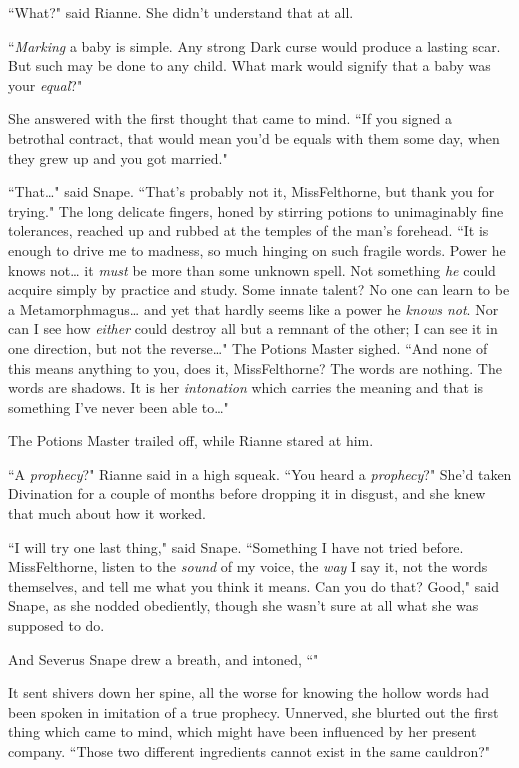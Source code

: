 ``What?" said Rianne. She didn't understand that at all.

``\emph{Marking} a baby is simple. Any strong Dark curse would produce a lasting scar. But such may be done to any child. What mark would signify that a baby was your \emph{equal}?"

She answered with the first thought that came to mind. ``If you signed a betrothal contract, that would mean you'd be equals with them some day, when they grew up and you got married."

``That{\ldots}" said Snape. ``That's probably not it, Miss\?Felthorne, but thank you for trying." The long delicate fingers, honed by stirring potions to unimaginably fine tolerances, reached up and rubbed at the temples of the man's forehead. ``It is enough to drive me to madness, so much hinging on such fragile words. Power he knows not{\ldots} it \emph{must} be more than some unknown spell. Not something \emph{he} could acquire simply by practice and study. Some innate talent? No one can learn to be a Metamorphmagus{\ldots} and yet that hardly seems like a power he \emph{knows not}. Nor can I see how \emph{either} could destroy all but a remnant of the other; I can see it in one direction, but not the reverse{\ldots}" The Potions Master sighed. ``And none of this means anything to you, does it, Miss\?Felthorne? The words are nothing. The words are shadows. It is her \emph{intonation} which carries the meaning and that is something I've never been able to{\ldots}"

The Potions Master trailed off, while Rianne stared at him.

``A \emph{prophecy}?" Rianne said in a high squeak. ``You heard a \emph{prophecy}?" She'd taken Divination for a couple of months before dropping it in disgust, and she knew that much about how it worked.

``I will try one last thing," said Snape. ``Something I have not tried before. Miss\?Felthorne, listen to the \emph{sound} of my voice, the \emph{way} I say it, not the words themselves, and tell me what you think it means. Can you do that? Good," said Snape, as she nodded obediently, though she wasn't sure at all what she was supposed to do.

And Severus Snape drew a breath, and intoned, ``"

It sent shivers down her spine, all the worse for knowing the hollow words had been spoken in imitation of a true prophecy. Unnerved, she blurted out the first thing which came to mind, which might have been influenced by her present company. ``Those two different ingredients cannot exist in the same cauldron?"

